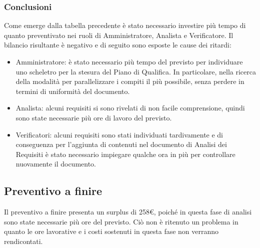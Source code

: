 \subsubsection{Conclusioni}
Come emerge dalla tabella precedente è stato necessario investire più tempo di quanto preventivato
nei ruoli di Amministratore, Analista e Verificatore.
Il bilancio risultante è negativo e di seguito sono esposte le cause dei ritardi:
\begin{itemize}
	\item Amministratore: è stato necessario più tempo del previsto per individuare uno scheletro per la stesura del Piano di Qualifica. In particolare,
	nella ricerca della modalità per parallelizzare i compiti il più possibile, senza perdere in termini di uniformità del documento.
	\item Analista: alcuni requisiti si sono rivelati di non facile comprensione, quindi sono state necessarie 
	più ore di lavoro del previsto.
	\item Verificatori: alcuni requisiti sono stati individuati tardivamente e di conseguenza per
	l’aggiunta di contenuti nel documento di Analisi dei Requisiti è stato necessario impiegare
	qualche ora in più per controllare nuovamente il documento.
\end{itemize}
\subsection{Preventivo a finire}
Il preventivo a finire presenta un surplus di 258\euro, poiché in questa fase di analisi sono state necessarie più ore del previsto.
Ciò non è ritenuto un problema in quanto le ore lavorative e i costi sostenuti in questa fase non verranno rendicontati.
